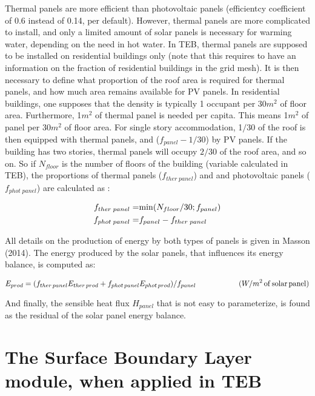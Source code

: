 Thermal panels are more efficient than photovoltaic panels (efficientcy coefficient of 0.6 instead of 0.14, per default). However, thermal panels are more complicated to install, and only a limited amount of solar panels is necessary for warming water, depending on the need in hot water. In TEB, thermal panels are supposed to be installed on residential buildings only (note that this requires to have an information on the fraction of residential buildings in the grid mesh). 
It is then necessary to define what proportion of the roof area is required for thermal panels, and how much area remains available for PV panels. In residential buildings, one supposes that the density is typically 1 occupant per 30$m^2$ of floor area. Furthermore, 1$m^2$ of thermal panel is needed per capita. This means 1$m^2$ of panel per 30$m^2$ of floor area. For single story accommodation, 1$/30$ of the roof is then equipped with thermal panels, and ($f_{panel} - 1/30$) by PV panels.  If the building has two stories, thermal panels will occupy $2/30$ of the roof area, and so on.
So if $N_{floor}$ is the number of floors of the building (variable calculated in TEB), the proportions of thermal panels ($ f_{ther\; panel}$) and and photovoltaic panels ($f_{phot\; panel}$) are calculated as :

\begin{eqnarray}
	f_{ther\; panel} = & {\rm min}(N_{floor}/30 ; f_{panel} ) \nonumber \\
	f_{phot\; panel} = & f_{panel} -  f_{ther\; panel} \nonumber
\end{eqnarray}

All details on the production of energy by both types of panels is given in Masson \etal (2014)\nocite{Masson2014}. The energy produced by the solar panels, that influences its energy balance, is computed as:

\begin{equation}
 E_{prod}  = (f_{ther\, panel} E_{ther\, prod} + f_{phot\, panel} E_{phot\, prod} ) /  f_{panel} \hspace{2.cm}  (W/m^2 \, {\rm of\, solar\, panel}) \nonumber
\end{equation}


And finally, the sensible heat flux $H_{panel}$ that is not easy to parameterize, is found as the residual of the solar panel energy balance. \\



\clearpage
\section{The Surface Boundary Layer module, when applied in TEB}\label{SBL_TEB}


